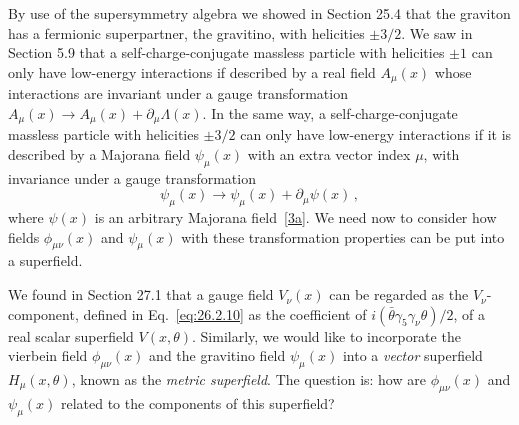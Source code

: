 By use of the supersymmetry algebra we showed in Section 25.4 that the
graviton has a fermionic superpartner, the gravitino, with helicities
\(\pm3/2\). We saw in Section 5.9 that a self-charge-conjugate massless
particle with helicities \(\pm1\) can only have low-energy interactions if
described by a real field \(A_\mu(x)\) whose interactions are invariant under
a gauge transformation
\(A_\mu(x)\to A_\mu(x)+\partial_\mu\Lambda(x)\). In the same way, a
self-charge-conjugate massless particle with helicities \(\pm3/2\) can only
have low-energy interactions if it is described by a Majorana field
\(\psi_\mu(x)\) with an extra vector index \(\mu\), with invariance under a
gauge transformation
\begin{equation}
  \psi_\mu(x)\to\psi_\mu(x)+\partial_\mu\psi(x)\,,
  \tag{31.1.13}\label{eq:31.1.13}
\end{equation}
where \(\psi(x)\) is an arbitrary Majorana
field~\hyperref[ch31-ref-3a]{[3a]}. We need now to consider how fields
\(\phi_{\mu\nu}(x)\) and \(\psi_\mu(x)\) with these transformation properties
can be put into a superfield.

We found in Section 27.1 that a gauge field \(V_\nu(x)\) can be regarded as
the \(V_\nu\)-component, defined in Eq.~\eqref{eq:26.2.10} as the coefficient
of \(i(\bar\theta\gamma_5\gamma_\nu\theta)/2\), of a real scalar superfield
\(V(x,\theta)\). Similarly, we would like to incorporate the vierbein field
\(\phi_{\mu\nu}(x)\) and the gravitino field \(\psi_\mu(x)\) into a
\emph{vector} superfield \(H_\mu(x,\theta)\), known as the \emph{metric
superfield}. The question is: how are \(\phi_{\mu\nu}(x)\) and
\(\psi_\mu(x)\) related to the components of this superfield?

